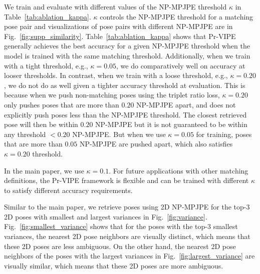  We train and evaluate with different values of the NP-MPJPE threshold $\kappa$ in Table~\ref{tab:ablation_kappa}. $\kappa$ controls the NP-MPJPE threshold for a matching pose pair and visualizations of pose pairs with different NP-MPJPE are in Fig.~\ref{fig:supp_similarity}. Table~\ref{tab:ablation_kappa} shows that Pr-VIPE generally achieves the best accuracy for a given NP-MPJPE threshold when the model is trained with the same matching threshold. Additionally, when we train with a tight threshold, e.g., $\kappa = 0.05$, we do comparatively well on accuracy at looser thresholds. In contrast, when we train with a loose threshold, e.g., $\kappa = 0.20$, we do not do as well given a tighter accuracy threshold at evaluation. This is because when we push non-matching poses using the triplet ratio loss, $\kappa = 0.20$ only pushes poses that are more than $0.20$ NP-MPJPE apart, and does not explicitly push poses less than the NP-MPJPE threshold. The closest retrieved pose will then be within $0.20$ NP-MPJPE but it is not guaranteed to be within any threshold $<0.20$ NP-MPJPE. But when we use $\kappa = 0.05$ for training, poses that are more than $0.05$ NP-MPJPE are pushed apart, which also satisfies $\kappa = 0.20$ threshold.

In the main paper, we use $\kappa = 0.1$. For future applications with other matching definitions, the Pr-VIPE framework is flexible and can be trained with different $\kappa$ to satisfy different accuracy requirements.


 Similar to the main paper, we retrieve poses using 2D NP-MPJPE for the top-$3$ 2D poses with smallest and largest variances in Fig.~\ref{fig:variance}. Fig.~\ref{fig:smallest_variance} shows that for the poses with the top-$3$ smallest variances, the nearest 2D pose neighbors are visually distinct, which means that these 2D poses are less ambiguous. On the other hand, the nearest 2D pose neighbors of the poses with the largest variances in Fig.~\ref{fig:largest_variance} are visually similar, which means that these 2D poses are more ambiguous.

\begin{figure*}[t!]
  \centering
  \\
  




\caption{Top retrievals by 2D NP-MPJPE from H3.6M hold-out subset for queries with top-$3$ largest and smallest variances. 2D poses are shown in the boxes.}
\label{fig:variance}
\end{figure*}

